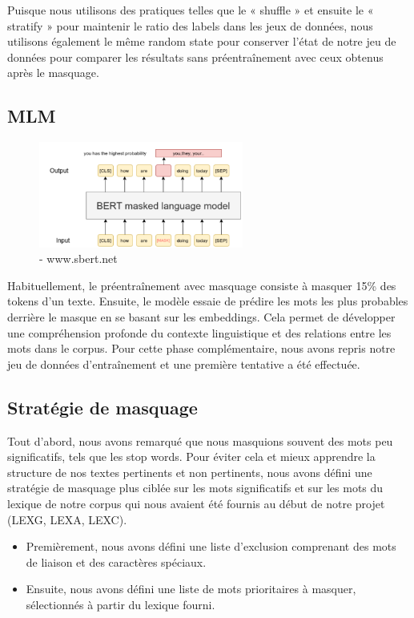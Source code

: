 \documentclass{article}
\begin{document}
Puisque nous utilisons des pratiques telles que le « shuffle » et ensuite le « stratify » pour maintenir le ratio des labels dans les jeux de données, nous utilisons également le même random state pour conserver l'état de notre jeu de données pour comparer les résultats sans préentraînement avec ceux obtenus après le masquage.

\subsection{MLM}

\begin{figure}[!htbp]
    \centering
    \includegraphics[width=0.6\textwidth]{MLM-2.png}
    \caption{- www.sbert.net}
    \label{fig:plots}
\end{figure}


Habituellement, le préentraînement avec masquage consiste à masquer 15\% des tokens d’un texte. Ensuite, le modèle essaie de prédire les mots les plus probables derrière le masque en se basant sur les embeddings. Cela permet de développer une compréhension profonde du contexte linguistique et des relations entre les mots dans le corpus. Pour cette phase complémentaire, nous avons repris notre jeu de données d'entraînement et une première tentative a été effectuée.\\

\subsection{Stratégie de masquage}
Tout d'abord, nous avons remarqué que nous masquions souvent des mots peu significatifs, tels que les stop words. Pour éviter cela et mieux apprendre la structure de nos textes pertinents et non pertinents, nous avons défini une stratégie de masquage plus ciblée sur les mots significatifs et sur les mots du lexique de notre corpus qui nous avaient été fournis au début de notre projet (LEXG, LEXA, LEXC).\\

\begin{itemize}
    \item Premièrement, nous avons défini une liste d'exclusion comprenant des mots de liaison et des caractères spéciaux.
    \item Ensuite, nous avons défini une liste de mots prioritaires à masquer, sélectionnés à partir du lexique fourni.
\end{itemize}
\vspace{10pt}
\end{document}
